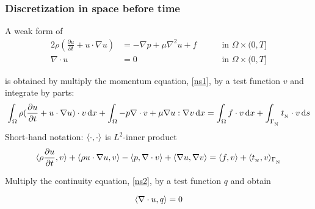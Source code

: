 \begin{frame}
\frametitle{Discretization in space before time}
A weak form of 
\begin{alignat}{2}
\label{ns1}
    \rho (\frac{\partial u}{\partial t} + u \cdot \nabla u)
    &=  -\nabla p  + \mu \nabla^2 u + f && \quad \text{ in } \Omega \times (0, T] \\
\label{ns2}
    \nabla \cdot u &= 0 && \quad \text{ in } \Omega \times (0, T] 
  \end{alignat}

is obtained by multiply the \alert{momentum equation}, \eqref{ns1}, by a test function $v$ and integrate by parts:
  \begin{equation*}
    \int_{\Omega} \rho (\frac{\partial u}{\partial t} + u \cdot \nabla u) \cdot v \, \mathrm{d}x
    + \int_{\Omega} - p \nabla \cdot v + \mu \nabla u : \nabla v \, \mathrm{d}x
    = \int_{\Omega} f \cdot v \, \mathrm{d}x
    + \int_{\Gamma_{_\mathrm{N}}} t_{_{\mathrm{N}}} \cdot v \, \mathrm{d}s
  \end{equation*}
  Short-hand notation: $\langle \cdot, \cdot \rangle$ is $L^2$-inner product
  \begin{equation*}
    \langle \rho \frac{\partial u}{\partial t}, v \rangle + \langle \rho u \cdot \nabla u, v \rangle
    - \langle p,  \nabla \cdot v \rangle
    + \langle \nabla u, \nabla v \rangle
    = \langle f, v \rangle
    + \langle t_{_{\mathrm{N}}}, v \rangle_{\Gamma_{_{\mathrm{N}}}}
  \end{equation*}

  \bigskip

  Multiply the \alert{continuity equation}, \eqref{ns2},  
  by a test function $q$ and obtain 

  \begin{equation*}
    \langle \nabla \cdot u, q \rangle = 0  
  \end{equation*}


\end{frame}
